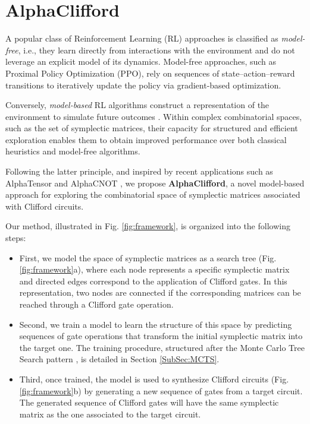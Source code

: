 \documentclass[conference]{IEEEtran}
\begin{document}
\section{AlphaClifford}
\label{sec:methpd}
A popular class of Reinforcement Learning (RL) approaches is classified as \emph{model-free}, i.e., they learn directly from interactions with the environment and do not leverage an explicit model of its dynamics. Model-free approaches, such as  Proximal Policy Optimization \cite{schulman2017ppo} (PPO), rely on sequences of state–action–reward transitions to iteratively update the policy via gradient-based optimization. 

Conversely, \emph{model-based} RL algorithms construct a representation of the environment to simulate future outcomes \cite{kocsis2006MCTS}. Within complex combinatorial spaces, such as the set of symplectic matrices, their capacity for structured and efficient exploration enables them to obtain improved performance over both classical heuristics and model-free algorithms.

Following the latter principle, and inspired by recent applications such as AlphaTensor \cite{alphatensor_quantum} and AlphaCNOT \cite{cossio2026alphacnotlearningcnotminimization}, we propose \textbf{AlphaClifford}, a novel model-based approach for exploring the combinatorial space of  symplectic matrices associated with Clifford circuits.

Our method, illustrated in Fig. \ref{fig:framework}, is organized into the following steps:
\begin{itemize}
    \item First, we model the space of symplectic matrices as a search tree (Fig. \ref{fig:framework}a), where each node represents a specific symplectic matrix and directed edges correspond to the application of Clifford gates. In this representation, two nodes are connected if the corresponding matrices can be reached through a Clifford gate operation.
    \item Second, we train a model to learn the structure of this space by predicting sequences of gate operations that transform the initial symplectic matrix into the target one. The training procedure, structured after the Monte Carlo Tree Search pattern \cite{coulom2007}, is detailed in Section \ref{SubSec:MCTS}.

    \item Third, once trained, the model is used to synthesize Clifford circuits (Fig. \ref{fig:framework}b) by generating a new sequence of gates from a target circuit. The generated sequence of Clifford gates will have the same symplectic matrix as the one associated to the target circuit. 
\end{itemize}
\end{document}
